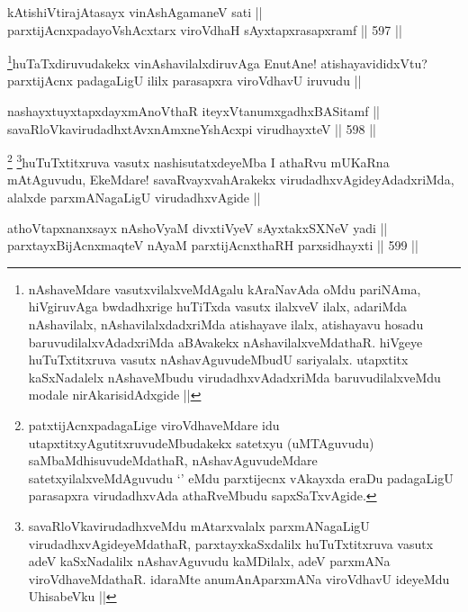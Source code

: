 \begin{shl}
kA\s tishiVtirajAtasayx vinAshAgamaneV sati ||  \\
parxtijAcnxpadayoVshAcxtarx viroVdhaH sAyxtapxrasapxramf ||  597 ||  
\end{shl}

\begin{artha}
\footnote{nAshaveMdare vasutxvilalxveMdAgalu kAraNavAda oMdu pariNAma, hiVgiruvAga bwdadhxrige huTiTxda vasutx ilalxveV ilalx, adariMda nAshavilalx, nAshavilalxdadxriMda atishayave ilalx, atishayavu hosadu baruvudilalxvAdadxriMda aBAvakekx nAshavilalxveMdathaR. hiVgeye huTuTxtitxruva vasutx nAshavAguvudeMbudU sariyalalx. utapxtitx kaSxNadalelx nAshaveMbudu virudadhxvAdadxriMda baruvudilalxveMdu modale nirAkarisidAdxgide ||}huTaTxdiruvudakekx vinAshavilalxdiruvAga EnutAne! atishayavididxVtu? parxtijAcnx padagaLigU ililx parasapxra viroVdhavU iruvudu ||
\end{artha}


\begin{shl}
nashayxtuyxtapxdayxmAnoV\s thaR iteyxVtanumxgadhxBASitamf || \\
savaRloVkavirudadhxtAvxnAmxneYshAcxpi virudhayxteV ||  598 ||  
\end{shl}

\begin{artha}
\footnote{patxtijAcnxpadagaLige viroVdhaveMdare idu utapxtitxyAgutitxruvudeMbudakekx satetxyu (uMTAguvudu) saMbaMdhisuvudeMdathaR, nAshavAguvudeMdare satetxyilalxveMdAguvudu `\stext' eMdu parxtijecnx vAkayxda eraDu padagaLigU parasapxra virudadhxvAda athaRveMbudu sapxSaTxvAgide.}
\footnote{savaRloVkavirudadhxveMdu mAtarxvalalx parxmANagaLigU virudadhxvAgideyeMdathaR, parxtayxkaSxdalilx huTuTxtitxruva vasutx adeV kaSxNadalilx nAshavAguvudu kaMDilalx, adeV parxmANa viroVdhaveMdathaR. idaraMte anumAnAparxmANa viroVdhavU ideyeMdu UhisabeVku ||}huTuTxtitxruva vasutx nashisutatxdeyeMba I athaRvu mUKaRna mAtAguvudu, EkeMdare! savaRvayxvahArakekx virudadhxvAgideyAdadxriMda, alalxde parxmANagaLigU virudadhxvAgide ||
\end{artha}


\begin{shl}
athoVtapxnanxsayx nAshoV\s yaM divxtiVyeV sAyxtakxSXNeV yadi || \\
parxtayxBijAcnxmaqteV nAyaM parxtijAcnxthaRH parxsidhayxti ||  599 ||  
\end{shl}

